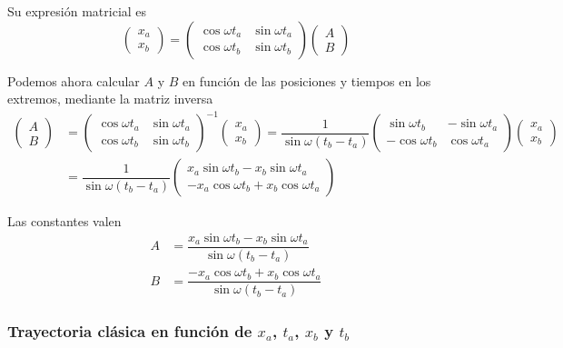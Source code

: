 Su expresión matricial es
\[
  \begin{pmatrix} x_a \\ x_b \end{pmatrix}
  =
  \begin{pmatrix}
    \cos\omega t_a & \sin\omega t_a\\
    \cos\omega t_b & \sin\omega t_b
  \end{pmatrix}
  \begin{pmatrix} A \\ B \end{pmatrix}
\]

Podemos ahora calcular $A$ y $B$ en función de las posiciones y
tiempos en los extremos, mediante la matriz inversa
\begin{align*}
  \begin{pmatrix} A \\ B \end{pmatrix}
  &=
  \begin{pmatrix}
    \cos\omega t_a & \sin\omega t_a\\
    \cos\omega t_b & \sin\omega t_b
  \end{pmatrix}^{-1}
  \begin{pmatrix} x_a \\ x_b \end{pmatrix}
  =
  \dfrac{1}{\sin\omega(t_b-t_a)}
  \begin{pmatrix}
    \sin\omega t_b & -\sin\omega t_a\\
    -\cos\omega t_b & \cos\omega t_a
  \end{pmatrix}
  \begin{pmatrix} x_a \\ x_b \end{pmatrix}\\
  &=
    \dfrac{1}{\sin\omega(t_b-t_a)}
    \begin{pmatrix}
      x_a\sin\omega t_b - x_b\sin\omega t_a \\
      -x_a\cos\omega t_b + x_b\cos\omega t_a
    \end{pmatrix}
\end{align*}

Las constantes valen
\begin{align*}
  A &= \dfrac{x_a\sin\omega t_b-x_b\sin\omega t_a}{\sin\omega(t_b-t_a)}\\
  B &= \dfrac{-x_a\cos\omega t_b+x_b\cos\omega t_a}{\sin\omega(t_b-t_a)}
  \end{align*}

  \subsubsection{Trayectoria clásica en función de $x_a$, $t_a$, $x_b$ y $t_b$}

